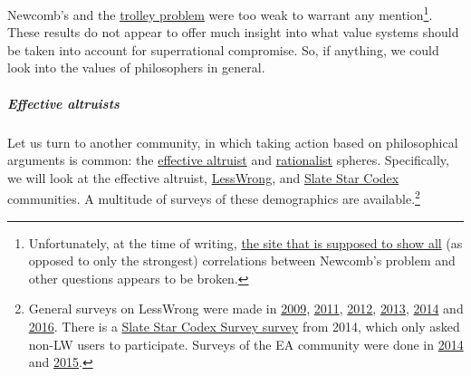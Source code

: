 Newcomb's and the
\href{https://en.wikipedia.org/wiki/Trolley_problem}{trolley
problem} were too weak to warrant any mention\footnote{Unfortunately,
  at the time of writing,
  \href{http://philpapers.org/surveys/linear_most_with.pl?A=main\%3ANewcomb\&flip=on\#main}{the
  site that is supposed to show all} (as opposed to only the strongest)
  correlations between Newcomb's problem and other questions appears to
  be broken.}. These results do not appear to offer much insight into
what value systems should be taken into account for superrational
compromise. So, if anything, we could look into the values of philosophers in general.

\hypertarget{effective-altruists}{\subparagraph{Effective
altruists}\label{effective-altruists}}

Let us turn to another community, in which taking action based on
philosophical arguments is common: the
\href{https://en.wikipedia.org/wiki/Effective_altruismhttps://en.wikipedia.org/wiki/Effective_altruism}{effective
altruist} and
\href{http://slatestarcodex.com/2014/09/05/mapmaker-mapmaker-make-me-a-map/}{rationalist}
spheres. Specifically, we will look at the effective altruist,
\href{https://en.wikipedia.org/wiki/LessWrong}{LessWrong}, and
\href{http://slatestarcodex.com/}{Slate Star Codex} communities.
A multitude of surveys of these demographics are available.\footnote{General
  surveys on LessWrong were made in
  \href{http://lesswrong.com/lw/fk/survey_results/}{2009},
  \href{http://lesswrong.com/lw/8p4/2011_survey_results/}{2011},
  \href{http://lesswrong.com/lw/fp5/2012_survey_results/}{2012},
  \href{http://lesswrong.com/lw/jj0/2013_survey_results/}{2013},
  \href{http://lesswrong.com/lw/lhg/2014_survey_results/}{2014}
  and
  \href{http://lesswrong.com/lw/nkw/2016_lesswrong_diaspora_survey_results/}{2016}.
  There is a
  \href{http://slatestarcodex.com/2015/11/04/2014-ssc-survey-results/}{Slate
  Star Codex Survey survey} from 2014, which only asked non-LW users to
  participate. Surveys of the EA community were done in
  \href{https://webcache.googleusercontent.com/search?q=cache:nmlsoMrw1JMJ:https://eahub.org/sites/effectivealtruismhub.com/files/survey/2014/results-and-analysis.pdf+\&cd=1\&hl=en\&ct=clnk\&gl=de}{2014}
  and
  \href{https://eahub.org/sites/eahub.org/files/SurveyReport2015.pdf}{2015}.}

